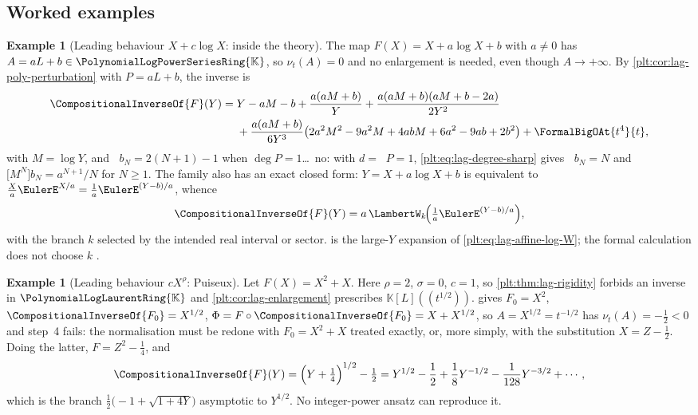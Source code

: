 \documentclass[11pt,oneside]{article}
\theoremstyle{plain}
\theoremstyle{definition}
\newtheorem{example}[theorem]{Example}
\theoremstyle{remark}
\newcommand{\K}{\mathbb{K}}
\newcommand{\PLpow}{\PolynomialLogPowerSeriesRing{\K}}   %
\newcommand{\PLlau}{\PolynomialLogLaurentRing{\K}}       %
\newcommand{\ordt}{\nu_{t}}                              %
\DeclareMathOperator{\degL}{deg_{L}}
\newcommand{\compose}{\mathbin{\circ}}
\newcommand{\rev}[1]{\CompositionalInverseOf{#1}}
\begin{document}
\subsection{Worked examples}
\label{plt:sec:lag-dominant-examples}

\begin{example}[Leading behaviour \(X+c\log X\): inside the theory]
\label{plt:ex:lag-affine-log}
The map \(F(X)=X+a\log X+b\) with \(a\ne0\) has \(A=aL+b\in\PLpow\), so
\(\ordt(A)=0\) and no enlargement is needed, even though
\(A\to+\infty\).  By \cref{plt:cor:lag-poly-perturbation} with
\(P=aL+b\), the inverse is
\begin{align}
  \rev{F}(Y)={}&Y-aM-b
    +\frac{a(aM+b)}{Y}
    +\frac{a(aM+b)(aM+b-2a)}{2Y^2}\notag\\
   &+\frac{a(aM+b)}{6Y^3}
     \bigl(2a^2M^2-9a^2M+4abM+6a^2-9ab+2b^2\bigr)
   +\FormalBigOAt{t^4}{t},
   \label{plt:eq:lag-affine-log-inverse}
\end{align}
with \(M=\log Y\), and \(\degL b_N=2(N+1)-1\) when \(\deg P=1\)\dots\ no: with
\(d=\degL P=1\), \cref{plt:eq:lag-degree-sharp} gives \(\degL b_N=N\) and
\(\bigl[M^{N}\bigr]b_N=a^{N+1}/N\) for \(N\ge1\).  The family also has an exact
closed form: \(Y=X+a\log X+b\) is equivalent to
\(\tfrac Xa\EulerE^{X/a}=\tfrac1a\EulerE^{(Y-b)/a}\), whence
\begin{equation}
\label{plt:eq:lag-affine-log-W}
  \rev{F}(Y)=a\,\LambertW_k\!\Bigl(\tfrac1a\EulerE^{(Y-b)/a}\Bigr),
\end{equation}
with the branch \(k\) selected by the intended real interval or sector.
 is the large-\(Y\) expansion of
\cref{plt:eq:lag-affine-log-W}; the formal calculation does not choose \(k\)
\cite{corless-et-al-1996,dlmf-W,wright-omega}.
\end{example}

\begin{example}[Leading behaviour \(cX^{\rho}\): Puiseux]
\label{plt:ex:lag-puiseux}
Let \(F(X)=X^2+X\).  Here \(\rho=2\), \(\sigma=0\), \(c=1\), so
\cref{plt:thm:lag-rigidity} forbids an inverse in \(\PLlau\) and
\cref{plt:cor:lag-enlargement} prescribes \(\K[L]((t^{1/2}))\).
 gives \(F_0=X^2\),
\(\rev{F_0}=X^{1/2}\), \(\Phi=F\compose\rev{F_0}=X+X^{1/2}\), so
\(A=X^{1/2}=t^{-1/2}\) has \(\ordt(A)=-\tfrac12<0\) and step~4 fails: the
normalisation must be redone with \(F_0=X^2+X\) treated exactly, or, more
simply, with the substitution \(X=Z-\tfrac12\).  Doing the latter,
\(F=Z^2-\tfrac14\), and
\[
  \rev{F}(Y)=\Bigl(Y+\tfrac14\Bigr)^{1/2}-\tfrac12
  =Y^{1/2}-\frac12+\frac18Y^{-1/2}-\frac1{128}Y^{-3/2}+\cdots,
\]
which is the branch \(\tfrac12\bigl(-1+\sqrt{1+4Y}\bigr)\) asymptotic to
\(Y^{1/2}\).  No integer-power ansatz can reproduce it.
\end{example}
\end{document}

